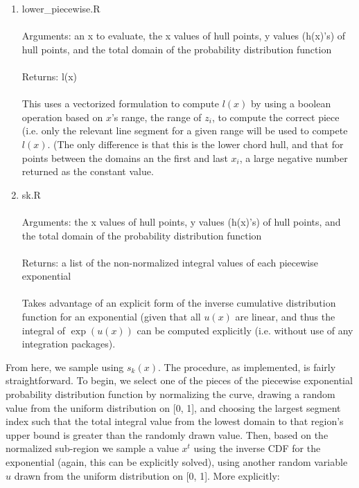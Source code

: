 \documentclass[12pt, oneside]{article}
\begin{document}
\begin{enumerate}
\item lower\_piecewise.R\\\\
Arguments: an x to evaluate, the x values of hull points, y values (h(x)'s) of hull points, and the total domain of the probability distribution function\\\\
Returns: l(x)\\\\
This uses a vectorized formulation to compute \(l(x)\) by using a boolean operation based on \(x\)'s range, the range of \(z_i\), to compute the correct piece (i.e. only the relevant line segment for a given range will be used to compete \(l(x)\).  (The only difference is that this is the lower chord hull, and that for points between the domains an the first and last \(x_i\), a large negative number returned as the constant value.

\item sk.R\\\\
Arguments: the x values of hull points, y values (h(x)'s) of hull points, and the total domain of the probability distribution function\\\\
Returns: a list of the non-normalized integral values of each piecewise exponential\\\\
Takes advantage of an explicit form of the inverse cumulative distribution function for an exponential (given that all \(u(x)\) are linear, and thus the integral of \(\exp(u(x))\) can be computed explicitly (i.e. without use of any integration packages).\\

\end{enumerate}

From here, we sample using \(s_k(x)\).  The procedure, as implemented, is fairly straightforward.  To begin, we select one of the pieces of the piecewise exponential probability distribution function by normalizing the curve, drawing a random value from the uniform distribution on [0, 1], and choosing the largest segment index such that the total integral value from the lowest domain to that region's upper bound is greater than the randomly drawn value.  Then, based on the normalized sub-region we sample a value \(x^t\) using the inverse CDF for the exponential (again, this can be explicitly solved), using another random variable \(u\) drawn from the uniform distribution on [0, 1].  More explicitly:
\end{document}
